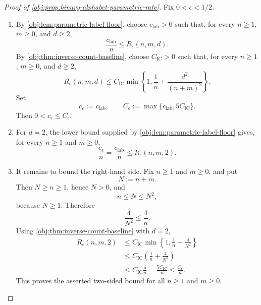 \begin{proof}[Proof of \cref{obj:prop:binary-alphabet-parametric-rate}]
Fix \(0<\epsilon<1/2\).
\begin{enumerate}
\item By \cref{obj:lem:parametric-label-floor}, choose \(c_{\mathrm{lab}}>0\) such that, for every \(n\ge1\), \(m\ge0\), and \(d\ge2\),
\[
\frac{c_{\mathrm{lab}}}{n}\le R_\epsilon(n,m,d).
\]
By \cref{obj:thm:inverse-count-baseline}, choose \(C_{\mathrm{IC}}>0\) such that, for every \(n\ge1\), \(m\ge0\), and \(d\ge2\),
\[
R_\epsilon(n,m,d)
\le
C_{\mathrm{IC}}
\min\left\{
1,\frac1n+\frac{d^2}{(n+m)^2}
\right\}.
\]
Set
\[
c_\epsilon:=c_{\mathrm{lab}},
\qquad
C_\epsilon:=\max\{c_{\mathrm{lab}},5C_{\mathrm{IC}}\}.
\]
Then \(0<c_\epsilon\le C_\epsilon\). %

\item For \(d=2\), the lower bound supplied by \cref{obj:lem:parametric-label-floor} gives, for every \(n\ge1\) and \(m\ge0\),
\[
\frac{c_\epsilon}{n}
=
\frac{c_{\mathrm{lab}}}{n}
\le
R_\epsilon(n,m,2).
\]

\item It remains to bound the right-hand side.  Fix \(n\ge1\) and \(m\ge0\), and put
\[
N:=n+m .
\]
Then \(N\ge n\ge1\), hence \(N>0\), and
\[
n\le N\le N^2,
\]
because \(N\ge1\).  Therefore
\[
\frac{4}{N^2}\le \frac4n .
\]
Using \cref{obj:thm:inverse-count-baseline} with \(d=2\),
\[
\begin{aligned}
R_\epsilon(n,m,2)
&\le
C_{\mathrm{IC}}
\min\left\{
1,\frac1n+\frac{4}{N^2}
\right\} \\
&\le
C_{\mathrm{IC}}
\left(\frac1n+\frac{4}{N^2}\right) \\
&\le
C_{\mathrm{IC}}\frac5n
=
\frac{5C_{\mathrm{IC}}}{n}
\le
\frac{C_\epsilon}{n}.
\end{aligned}
\]
This proves the asserted two-sided bound for all \(n\ge1\) and \(m\ge0\). %
\end{enumerate}
\end{proof}
